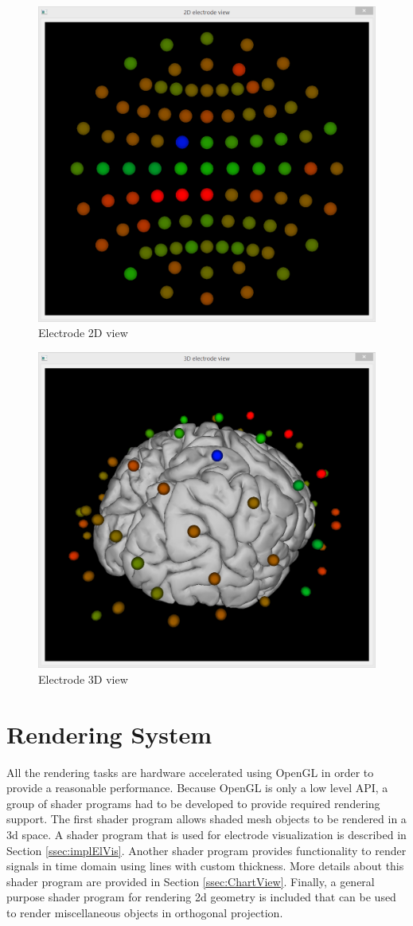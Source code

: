 \begin{figure}[htbp]
	\centering
	\includegraphics[width=0.7\linewidth]{fig/view2D.png}
	\caption{Electrode 2D view}
	\label{fig:view2D}
\end{figure}

\begin{figure}[htbp]
	\centering
	\includegraphics[width=0.7\linewidth]{fig/view3D.png}
	\caption{Electrode 3D view}
	\label{fig:view3D}
\end{figure}

\section{Rendering System}
\label{sec:implRendering}
All the rendering tasks are hardware accelerated using OpenGL in order to provide a reasonable performance. Because OpenGL is only a low level API, a group of shader programs had to be developed to provide required rendering support. The first shader program allows shaded mesh objects to be rendered in a \gls{3d} space. A shader program that is used for electrode visualization is described in Section \ref{ssec:implElVis}. Another shader program provides functionality to render signals in time domain using lines with custom thickness. More details about this shader program are provided in Section \ref{ssec:ChartView}. Finally, a general purpose shader program for rendering \gls{2d} geometry is included that can be used to render miscellaneous objects in orthogonal projection.  

